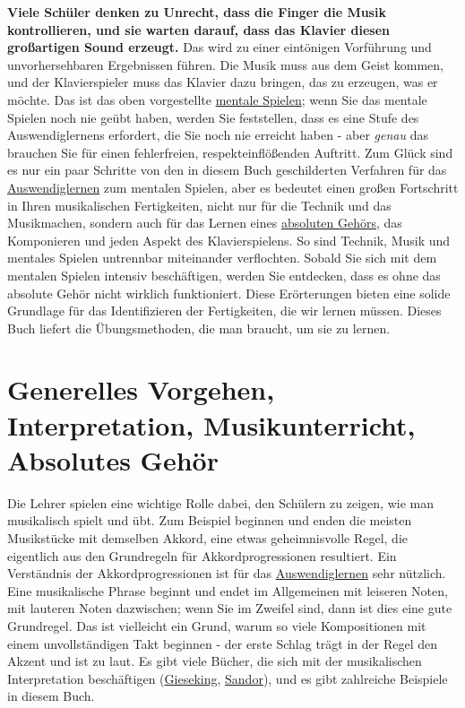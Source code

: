\textbf{Viele Schüler denken zu Unrecht, dass die Finger die Musik kontrollieren, und sie warten darauf, dass das Klavier diesen großartigen Sound erzeugt.}
Das wird zu einer eintönigen Vorführung und unvorhersehbaren Ergebnissen führen.
Die Musik muss aus dem Geist kommen, und der Klavierspieler muss das Klavier dazu bringen, das zu erzeugen, was er möchte.
Das ist das oben vorgestellte \hyperlink{c1ii12mental}{mentale Spielen};
wenn Sie das mentale Spielen noch nie geübt haben, werden Sie feststellen, dass es eine Stufe des Auswendiglernens erfordert, die Sie noch nie erreicht haben - aber \textit{genau} das brauchen Sie für einen fehlerfreien, respekteinflößenden Auftritt.
Zum Glück sind es nur ein paar Schritte von den in diesem Buch geschilderten Verfahren für das \hyperlink{c1iii6}{Auswendiglernen} zum mentalen Spielen, aber es bedeutet einen großen Fortschritt in Ihren musikalischen Fertigkeiten, nicht nur für die Technik und das Musikmachen, sondern auch für das Lernen eines \hyperlink{c1iii12}{absoluten Gehörs}, das Komponieren und jeden Aspekt des Klavierspielens.
So sind Technik, Musik und mentales Spielen untrennbar miteinander verflochten.
Sobald Sie sich mit dem mentalen Spielen intensiv beschäftigen, werden Sie entdecken, dass es ohne das absolute Gehör nicht wirklich funktioniert.
Diese Erörterungen bieten eine solide Grundlage für das Identifizieren der Fertigkeiten, die wir lernen müssen.
Dieses Buch liefert die Übungsmethoden, die man braucht, um sie zu lernen.


\section{Generelles Vorgehen, Interpretation, Musikunterricht, Absolutes Gehör}\hypertarget{c1i4}{}

Die Lehrer spielen eine wichtige Rolle dabei, den Schülern zu zeigen, wie man musikalisch spielt und übt.
Zum Beispiel beginnen und enden die meisten Musikstücke mit demselben Akkord, eine etwas geheimnisvolle Regel, die eigentlich aus den Grundregeln für Akkordprogressionen resultiert.
Ein Verständnis der Akkordprogressionen ist für das \hyperlink{c1iii6}{Auswendiglernen} sehr nützlich.
Eine musikalische Phrase beginnt und endet im Allgemeinen mit leiseren Noten, mit lauteren Noten dazwischen; wenn Sie im Zweifel sind, dann ist dies eine gute Grundregel.
Das ist vielleicht ein Grund, warum so viele Kompositionen mit einem unvollständigen Takt beginnen - der erste Schlag trägt in der Regel den Akzent und ist zu laut.
Es gibt viele Bücher, die sich mit der musikalischen Interpretation beschäftigen (\hyperlink{Gieseking}{Gieseking}, \hyperlink{Sandor}{Sandor}), und es gibt zahlreiche Beispiele in diesem Buch.

